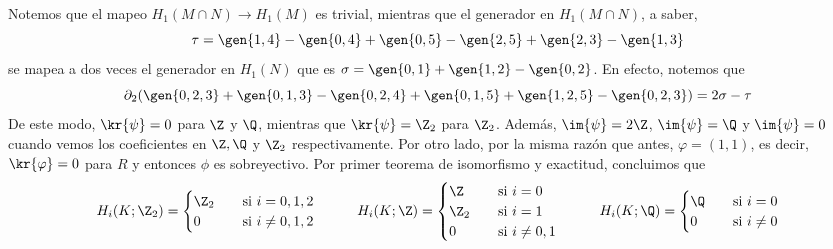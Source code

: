 \documentclass{article}
\begin{document}
\begin{enumerate}
    \vspace{2mm}
    \centerline{
    }
    \vspace{1mm}
    Notemos que el mapeo $H_{1}(M\cap N)\to H_{1}(M)$ es trivial, mientras que el generador en 
    $H_{1}(M\cap N)$, a saber,
    \begin{equation*}
        \tau=\gen{1,4}-\gen{0,4}+\gen{0,5}-\gen{2,5}+\gen{2,3}-\gen{1,3}
    \end{equation*}
    se mapea a dos veces el generador en $H_{1}(N)$ que es $\sigma=\gen{0,1}+\gen{1,2}-\gen{0,2}$.
    En efecto, notemos que
    \begin{equation*}
        \partial_{2}(\gen{0,2,3}+\gen{0,1,3}-\gen{0,2,4}+\gen{0,1,5}+\gen{1,2,5}-\gen{0,2,3})=
        2\sigma-\tau
    \end{equation*}
    De este modo, $\kr{\psi}=0$ para $\Z$ y $\Q$, mientras que $\kr{\psi}=\Z_{2}$ para $\Z_{2}$.
    Además, $\im{\psi}=2\Z$, $\im{\psi}=\Q$ y $\im{\psi}=0$ cuando vemos los coeficientes en 
    $\Z,\Q$ y $\Z_{2}$ respectivamente. Por otro lado, por la misma razón que antes, 
    $\varphi=(1,1)$, es decir, $\kr{\varphi}=0$ para $R$ y entonces $\phi$ es sobreyectivo. 
    Por primer teorema de isomorfismo y exactitud, concluimos que
    \begin{equation*}
        H_{i}(K;\Z_{2})=\begin{cases}
            \Z_{2} &\quad\text{si }i=0,1,2 \\
            0 &\quad\text{si }i\neq0,1,2
        \end{cases}
        \hspace{1cm}
        H_{i}(K;\Z)=\begin{cases}
            \Z & \quad\text{si }i=0 \\
            \Z_{2} & \quad\text{si }i=1 \\
            0 & \quad\text{si }i\neq0,1
        \end{cases}
        \hspace{1cm}
        H_{i}(K;\Q)=\begin{cases}
            \Q & \quad\text{si }i=0 \\
            0 & \quad\text{si }i\neq0
        \end{cases}
    \end{equation*}
\end{enumerate}
\end{document}
